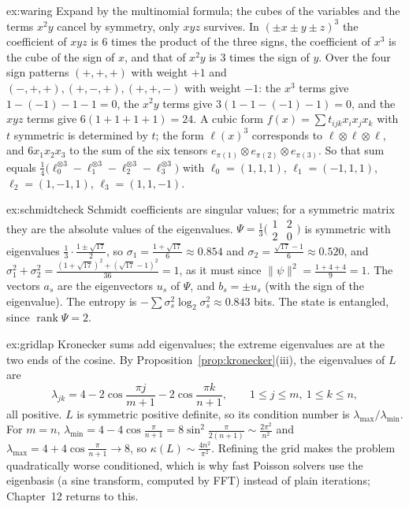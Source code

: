 \begin{solution}{ex:waring}
\idea Expand by the multinomial formula; the cubes of the variables and the terms $x^2y$ cancel by symmetry, only $xyz$ survives.
\writeup In $(\pm x\pm y\pm z)^3$ the coefficient of $xyz$ is $6$ times the product of the three signs, the coefficient of $x^3$ is the
cube of the sign of $x$, and that of $x^2y$ is $3$ times the sign of $y$. Over the four sign patterns $(+,+,+)$ with weight $+1$ and
$(-,+,+),(+,-,+),(+,+,-)$ with weight $-1$: the $x^3$ terms give $1-(-1)-1-1=0$, the $x^2y$ terms give $3(1-1-(-1)-1)=0$, and the
$xyz$ terms give $6(1+1+1+1)=24$. A cubic form $f(x)=\sum t_{ijk}x_ix_jx_k$ with $t$ symmetric is determined by $t$; the form $\ell(x)^3$
corresponds to $\ell\otimes\ell\otimes\ell$, and $6x_1x_2x_3$ to the sum of the six tensors $e_{\pi(1)}\otimes e_{\pi(2)}\otimes e_{\pi(3)}$. So
that sum equals $\frac14\bigl(\ell_0^{\otimes3}-\ell_1^{\otimes3}-\ell_2^{\otimes3}-\ell_3^{\otimes3}\bigr)$ with $\ell_0=(1,1,1)$, $\ell_1=(-1,1,1)$,
$\ell_2=(1,-1,1)$, $\ell_3=(1,1,-1)$.
\end{solution}

\begin{solution}{ex:schmidtcheck}
\idea Schmidt coefficients are singular values; for a symmetric matrix they are the absolute values of the eigenvalues.
\writeup $\Psi=\frac13\bigl(\begin{smallmatrix}1&2\\2&0\end{smallmatrix}\bigr)$ is symmetric with eigenvalues $\frac13\cdot\frac{1\pm\sqrt{17}}2$,
so $\sigma_1=\frac{1+\sqrt{17}}6\approx0.854$ and $\sigma_2=\frac{\sqrt{17}-1}6\approx0.520$, and
$\sigma_1^2+\sigma_2^2=\frac{(1+\sqrt{17})^2+(\sqrt{17}-1)^2}{36}=1$, as it must since $\|\psi\|^2=\frac{1+4+4}9=1$. The vectors $a_s$ are the eigenvectors $u_s$ of $\Psi$, and $b_s=\pm u_s$
(with the sign of the eigenvalue). The entropy is $-\sum\sigma_s^2\log_2\sigma_s^2\approx0.843$ bits. The state is entangled, since
$\operatorname{rank}\Psi=2$.
\end{solution}

\begin{solution}{ex:gridlap}
\idea Kronecker sums add eigenvalues; the extreme eigenvalues are at the two ends of the cosine.
\writeup By Proposition~\ref{prop:kronecker}(iii), the eigenvalues of $L$ are
\[
\lambda_{jk}=4-2\cos\frac{\pi j}{m+1}-2\cos\frac{\pi k}{n+1},\qquad1\le j\le m,\ 1\le k\le n,
\]
all positive. $L$ is symmetric positive definite, so its condition number is $\lambda_{\max}/\lambda_{\min}$. For $m=n$,
$\lambda_{\min}=4-4\cos\frac\pi{n+1}=8\sin^2\frac\pi{2(n+1)}\sim\frac{2\pi^2}{n^2}$ and $\lambda_{\max}=4+4\cos\frac\pi{n+1}\to8$, so
$\kappa(L)\sim\frac{4n^2}{\pi^2}$. Refining the grid makes the problem quadratically worse conditioned, which is why fast Poisson solvers
use the eigenbasis (a sine transform, computed by FFT) instead of plain iterations; Chapter~12 returns to this.
\end{solution}

